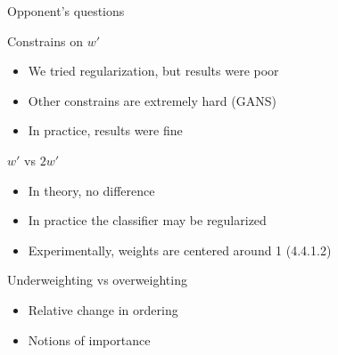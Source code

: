 \documentclass[xcolor={table}]{beamer}
\begin{document}
\begin{frame}{Opponent's questions}
    \small
    \begin{block}{Constrains on $w'$}
        \begin{itemize}
            \itemsep0em
            \item We tried regularization, but results were poor
            \item Other constrains are extremely hard (GANS)
            \item In practice, results were fine
        \end{itemize}
    \end{block}
    
    \begin{block}{$w'$ vs $2w'$}
        \begin{itemize}
            \itemsep0em
            \item In theory, no difference %
            \item In practice the classifier may be regularized
            \item Experimentally, weights are centered around 1 (4.4.1.2)
        \end{itemize}
    \end{block}
    
    \begin{block}{Underweighting vs overweighting}
        \begin{itemize}
            \itemsep0em
            \item Relative change in ordering %
            \item Notions of importance %
        \end{itemize}
    \end{block}
\end{frame}
\end{document}
